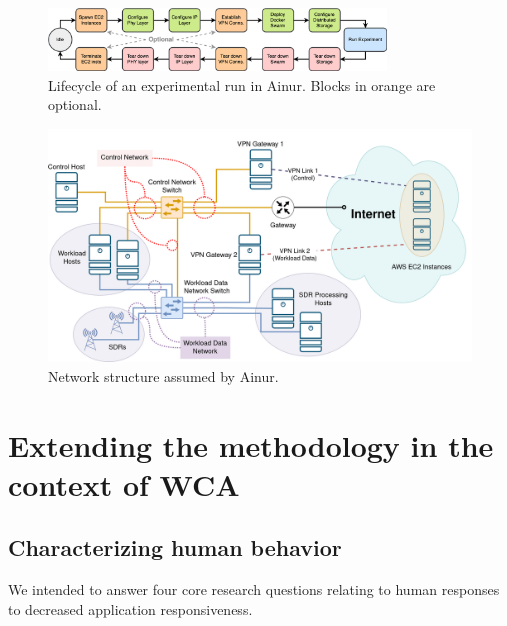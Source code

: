 \begin{figure}
    \centering
    \includegraphics[width=0.8\textwidth]{publications/2022Ainur/figures/flow2.png}
    \caption{Lifecycle of an experimental run in Ainur. Blocks in orange are optional.}\label{fig:flow}
\end{figure}

\begin{figure}
    \centering
    \includegraphics[width=.8\textwidth]{publications/2022Ainur/figures/network.png}
    \caption{Network structure assumed by Ainur.}\label{fig:network}
\end{figure}

\section{Extending the methodology in the context of \acs{WCA}}

\subsection{Characterizing human behavior}



We intended to answer four core research questions relating to human responses to decreased application responsiveness.

